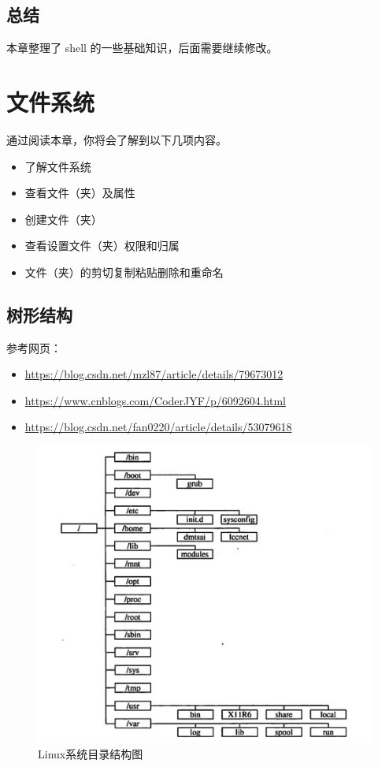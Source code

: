 \documentclass[doctor,openright,twoside]{sjtuthesis}
\providecommand{\tightlist}{%
    \setlength{\itemsep}{0pt}\setlength{\parskip}{0pt}}
\theoremstyle{plain}
\theoremstyle{definition}
\theoremstyle{remark}
\theoremstyle{ocrenumbox}
\theoremstyle{plain}
\begin{document}
\hypertarget{-3}{%
\section{总结}\label{-3}}

本章整理了 shell 的一些基础知识，后面需要继续修改。

\hypertarget{chap:filesystem}{%
\chapter{文件系统}\label{chap:filesystem}}

通过阅读本章，你将会了解到以下几项内容。

\begin{itemize}
\tightlist
\item
  了解文件系统
\item
  查看文件（夹）及属性
\item
  创建文件（夹）
\item
  查看设置文件（夹）权限和归属
\item
  文件（夹）的剪切复制粘贴删除和重命名
\end{itemize}

\section{树形结构}

参考网页：

\begin{itemize}
\tightlist
\item
  \url{https://blog.csdn.net/mzl87/article/details/79673012}
\item
  \url{https://www.cnblogs.com/CoderJYF/p/6092604.html}
\item
  \url{https://blog.csdn.net/fan0220/article/details/53079618}
\end{itemize}

\begin{figure}
\centering
\includegraphics{images/linux-fs-tree.png}
\caption{Linux系统目录结构图}
\end{figure}
\end{document}
